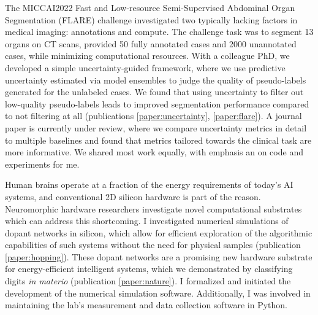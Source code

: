 \vspace{-1mm}
The MICCAI2022 Fast and Low-resource Semi-Supervised Abdominal Organ Segmentation (FLARE) challenge investigated two typically lacking factors in medical imaging: annotations and compute.
The challenge task was to segment 13 organs on CT scans, provided 50 fully annotated cases and 2000 unannotated cases, while minimizing computational resources.
With a colleague PhD, we developed a simple uncertainty-guided framework, where we use predictive uncertainty estimated via model ensembles to judge the quality of pseudo-labels generated for the unlabeled cases.
We found that using uncertainty to filter out low-quality pseudo-labels leads to improved segmentation performance compared to not filtering at all (publications \ref{paper:uncertainty}, \ref{paper:flare}).
A journal paper is currently under review, where we compare uncertainty metrics in detail to multiple baselines and found that metrics tailored towards the clinical task are more informative.
We shared most work equally, with emphasis an on code and experiments for me.


\vspace{-1mm}
Human brains operate at a fraction of the energy requirements of today’s AI systems, and conventional 2D silicon hardware is part of the reason.
Neuromorphic hardware researchers investigate novel computational substrates which can address this shortcoming.
I investigated numerical simulations of dopant networks in silicon, which allow for efficient exploration of the algorithmic capabilities of such systems without the need for physical samples (publication \ref{paper:hopping}).
These dopant networks are a promising new hardware substrate for energy-efficient intelligent systems, which we demonstrated by classifying digits \textit{in materio} (publication \ref{paper:nature}).
I formalized and initiated the development of the numerical simulation software. Additionally, I was involved in maintaining the lab's measurement and data collection software in Python.
